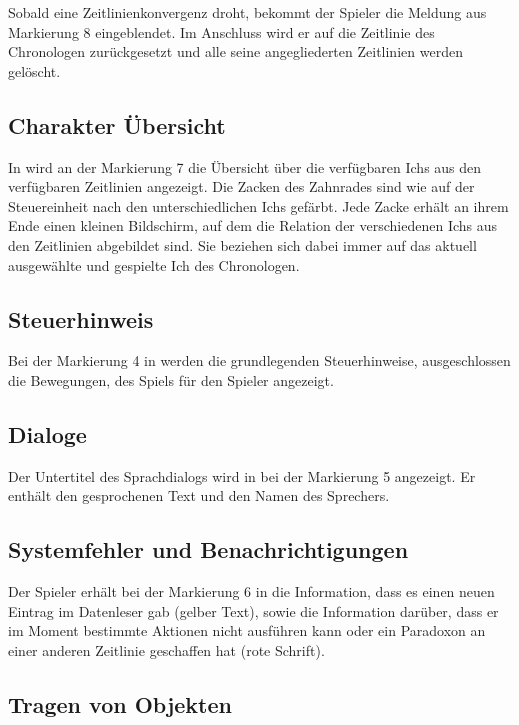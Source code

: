 Sobald eine Zeitlinienkonvergenz droht, bekommt der Spieler die Meldung aus Markierung 8 eingeblendet. Im Anschluss wird er auf die Zeitlinie des Chronologen zurückgesetzt und alle seine angegliederten Zeitlinien werden gelöscht.
\subsection{Charakter Übersicht}\label{sec:character-overview}
In  wird an der Markierung 7 die Übersicht über die verfügbaren Ichs aus den verfügbaren Zeitlinien angezeigt. Die Zacken des Zahnrades sind wie auf der Steuereinheit nach den unterschiedlichen Ichs gefärbt. Jede Zacke erhält an ihrem Ende einen kleinen Bildschirm, auf dem die Relation der verschiedenen Ichs aus den Zeitlinien abgebildet sind. Sie beziehen sich dabei immer auf das aktuell ausgewählte und gespielte Ich des Chronologen.
\subsection{Steuerhinweis}
Bei der Markierung 4 in  werden die grundlegenden Steuerhinweise, ausgeschlossen die Bewegungen, des Spiels für den Spieler angezeigt.
\subsection{Dialoge}
Der Untertitel des Sprachdialogs wird in  bei der Markierung 5 angezeigt. Er enthält den gesprochenen Text und den Namen des Sprechers.
\subsection{Systemfehler und Benachrichtigungen}
Der Spieler erhält bei der Markierung 6 in  die Information, dass es einen neuen Eintrag im Datenleser gab (gelber Text), sowie die Information darüber, dass er im Moment bestimmte Aktionen nicht ausführen kann oder ein Paradoxon an einer anderen Zeitlinie geschaffen hat (rote Schrift).

\newpage
\subsection{Tragen von Objekten}\label{sec:carry-objects}

